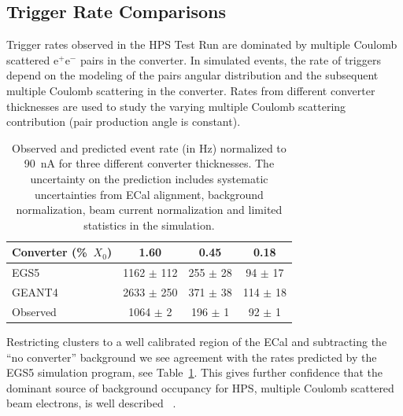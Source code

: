 \documentclass[final,3p,times,twocolumn]{elsarticle}
\newcommand{\ee}{e$^+$e$^-$}
\newcommand{\egs}{{\sc EGS5}}
\newcommand{\moliere}{Moli\`{e}re}
\begin{document}
\subsection{Trigger Rate Comparisons}
Trigger rates observed in the HPS Test Run are dominated by multiple Coulomb scattered \ee{} pairs in the 
converter. In simulated events, the rate of triggers depend on the modeling of the pairs angular 
distribution and the subsequent multiple Coulomb scattering in the converter. Rates from different 
converter 
thicknesses are used to study the varying multiple Coulomb scattering contribution (pair production 
angle is constant). 
\begin{table}
\label{results}
{\small
\begin{tabular}{|l|c|c|c|}
\hline
\bf Converter (\%~$X_0$) & \bf 1.60 & \bf 0.45 &	\bf 0.18 \\
\hline
EGS5 &	1162 $\pm$ 112 &	255 $\pm$ 28 &	94 $\pm$ 17	\\
\hline
GEANT4 & 2633 $\pm$ 250 & 	371 $\pm$ 38 &	114 $\pm$ 18 \\
\hline
Observed 	& 1064 $\pm$ 2 & 196 $\pm$ 1 &	92 $\pm$ 1 \\						
\hline
\end{tabular}
\caption{ Observed and predicted event rate (in Hz) normalized to 90~nA for three different converter 
thicknesses. The uncertainty on the prediction includes systematic uncertainties from ECal alignment, background normalization, beam current normalization and limited statistics in the simulation.}
}
\end{table}
Restricting clusters to a well calibrated region of the ECal and subtracting the ``no converter'' 
background we see agreement with the rates predicted by the \egs{} simulation 
program, 
see Table~\ref{results}.
This gives further confidence that the dominant source of background occupancy for HPS, multiple 
Coulomb scattered beam electrons, is well 
described~\cite{Attwood:2005zz,Shen:1978ha,Gottschalk1993467} . 
\end{document}
